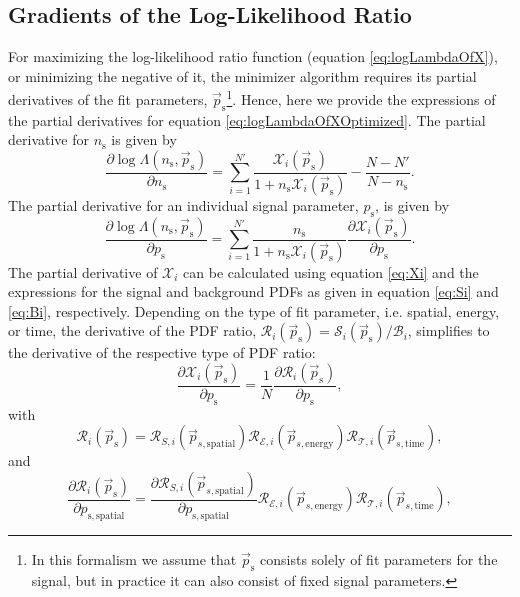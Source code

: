 \documentclass{article}
\newcommand{\ns}{n_{\mathrm{s}}}
\newcommand{\ps}{\vec{p}_{\mathrm{s}}}
\begin{document}
\subsection{Gradients of the Log-Likelihood Ratio}

For maximizing the log-likelihood ratio function (equation \ref{eq:logLambdaOfX}),
or minimizing the negative of it, the minimizer algorithm requires its partial
derivatives of the fit parameters, $\ps$\footnote{In this formalism we assume that $\ps$
consists solely of fit parameters for the signal, but in practice it can also consist of fixed
signal parameters.}. Hence, here we provide the expressions of the partial derivatives
for equation \ref{eq:logLambdaOfXOptimized}.
The partial derivative for $\ns$ is given by
\begin{equation}
\frac{\partial \log \Lambda(\ns,\ps)}{\partial \ns} = \sum_{i=1}^{N'} \frac{\mathcal{X}_i(\ps)}{1+\ns \mathcal{X}_i(\ps)} - \frac{N - N'}{N - \ns}.
\end{equation}
The partial derivative for an individual signal parameter, $p_{\mathrm{s}}$,
is given by
\begin{equation}
 \frac{\partial \log \Lambda(\ns,\ps)}{\partial p_{\mathrm{s}}} = \sum_{i=1}^{N'} \frac{\ns}{1+\ns\mathcal{X}_i(\ps)} \frac{\partial \mathcal{X}_i(\ps)}{\partial p_{\mathrm{s}}}.
\end{equation}
The partial derivative of $\mathcal{X}_i$ can be calculated using
equation \ref{eq:Xi} and the expressions for the signal and background PDFs as given
in equation \ref{eq:Si} and \ref{eq:Bi}, respectively. Depending on the type of
fit parameter, i.e. spatial, energy, or time, the derivative of the PDF ratio,
$\mathcal{R}_i(\ps) = \mathcal{S}_i(\ps) / \mathcal{B}_i$, simplifies to the
derivative of the respective type of PDF ratio:
\begin{equation}
 \frac{\partial \mathcal{X}_i(\ps)}{\partial p_{\mathrm{s}}} = \frac{1}{N}\frac{\partial \mathcal{R}_i(\ps)}{\partial p_{\mathrm{s}}},
\end{equation}
with
\begin{equation}
 \mathcal{R}_i(\ps) = \mathcal{R}_{S,i}(\vec{p}_{s,\mathrm{spatial}}) \mathcal{R}_{\mathcal{E},i}(\vec{p}_{s,\mathrm{energy}}) \mathcal{R}_{\mathcal{T},i}(\vec{p}_{s,\mathrm{time}}),
 \label{eq:Ri}
\end{equation}
and
\begin{equation}
 \frac{\partial \mathcal{R}_i(\ps)}{\partial p_{\mathrm{s,spatial}}} = \frac{\partial \mathcal{R}_{S,i}(\vec{p}_{s,\mathrm{spatial}})}{\partial p_{\mathrm{s,spatial}}} \mathcal{R}_{\mathcal{E},i}(\vec{p}_{s,\mathrm{energy}}) \mathcal{R}_{\mathcal{T},i}(\vec{p}_{s,\mathrm{time}}),
\end{equation}
\end{document}
